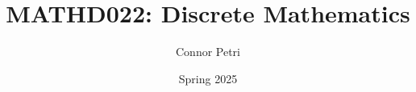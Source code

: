 \documentclass[12pt, letterpaper]{article}
\title{MATHD022: Discrete Mathematics}
\author{Connor Petri}
\date{Spring 2025}
\begin{document}
\maketitle
\pagebreak
\tableofcontents
\pagebreak
\end{document}
